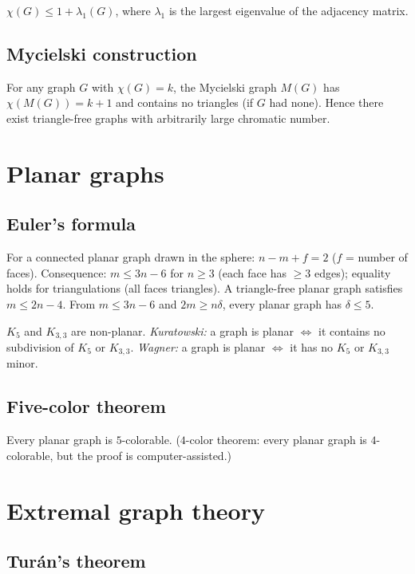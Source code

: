 $\chi(G)\le 1+\lambda_1(G)$, where $\lambda_1$ is the largest eigenvalue of the adjacency matrix.

\subsection{Mycielski construction}
\label{subsec:mycielski}

For any graph $G$ with $\chi(G)=k$, the Mycielski graph $M(G)$ has $\chi(M(G))=k+1$ and contains no triangles (if $G$ had none). Hence there exist triangle-free graphs with arbitrarily large chromatic number.

\medskip

\section{Planar graphs}
\label{sec:planar}

\subsection{Euler's formula}
\label{subsec:euler-formula}

For a connected planar graph drawn in the sphere: $n-m+f=2$ ($f$ = number of faces). Consequence: $m\le3n-6$ for $n\ge3$ (each face has $\ge3$ edges); equality holds for triangulations (all faces triangles). A triangle-free planar graph satisfies $m\le2n-4$. From $m\le3n-6$ and $2m\ge n\delta$, every planar graph has $\delta\le5$.

$K_5$ and $K_{3,3}$ are non-planar. \textit{Kuratowski:} a graph is planar $\iff$ it contains no subdivision of $K_5$ or $K_{3,3}$. \textit{Wagner:} a graph is planar $\iff$ it has no $K_5$ or $K_{3,3}$ minor.

\subsection{Five-color theorem}
\label{subsec:five-color}

Every planar graph is $5$-colorable. ($4$-color theorem: every planar graph is $4$-colorable, but the proof is computer-assisted.)

\medskip

\section{Extremal graph theory}
\label{sec:extremal}

\subsection{Tur\'an's theorem}
\label{subsec:turan}

